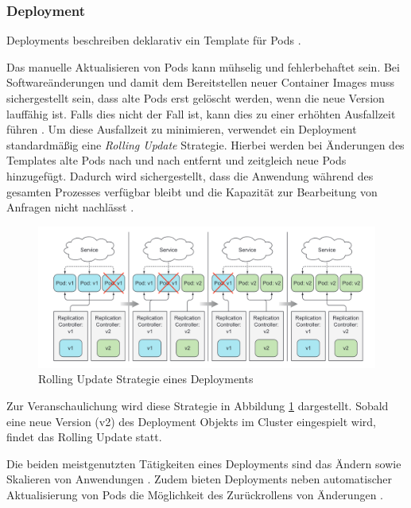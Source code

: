 \subsubsection{Deployment}
\label{subsec:kubernetes:deployment}
Deployments beschreiben deklarativ ein Template für Pods \cite{kubernetesDeployments}. 

Das manuelle Aktualisieren von Pods kann mühselig und fehlerbehaftet sein. Bei Softwareänderungen und damit dem
Bereitstellen neuer Container Images muss sichergestellt sein, dass alte Pods erst gelöscht werden, wenn die neue Version
lauffähig ist. Falls dies nicht der Fall ist, kann dies zu einer erhöhten Ausfallzeit führen \cite{Marko2018}.
Um diese Ausfallzeit zu minimieren, verwendet ein Deployment standardmäßig eine \emph{Rolling Update} Strategie.
Hierbei werden bei Änderungen des Templates alte Pods nach und nach entfernt und zeitgleich neue Pods hinzugefügt.
Dadurch wird sichergestellt, dass die Anwendung während des gesamten Prozesses verfügbar bleibt und die Kapazität zur Bearbeitung
von Anfragen nicht nachlässt \cite{Marko2018}.

\begin{figure}[h]
  \centering
  \includegraphics[width=\textwidth]{gfx/chapters/2_grundlagen/deployment_rollout.png}
  \caption{Rolling Update Strategie eines Deployments}
  \label{fig:kubernetes_rolling_update}
\end{figure}

Zur Veranschaulichung wird diese Strategie in Abbildung \ref{fig:kubernetes_rolling_update} dargestellt.
Sobald eine neue Version (v2) des Deployment Objekts im Cluster eingespielt wird, findet das Rolling Update statt.


Die beiden meistgenutzten Tätigkeiten eines Deployments sind das Ändern sowie Skalieren von Anwendungen \cite{Burns2019}.
Zudem bieten Deployments neben automatischer Aktualisierung von Pods die Möglichkeit des Zurückrollens von Änderungen \cite{kubernetesDeployments}.
